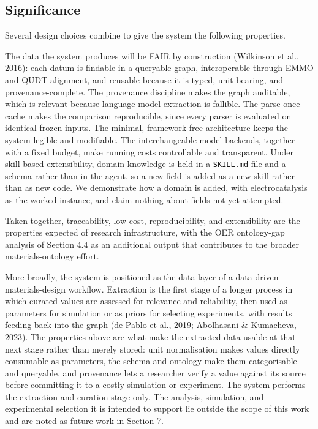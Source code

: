 \documentclass{template}
\begin{document}
\subsection{Significance}

Several design choices combine to give the system the following properties.

The data the system produces will be FAIR by construction (Wilkinson et al., 2016): each datum is findable in a queryable graph, interoperable through EMMO and QUDT alignment, and reusable because it is typed, unit-bearing, and provenance-complete. The provenance discipline makes the graph auditable, which is relevant because language-model extraction is fallible. The parse-once cache makes the comparison reproducible, since every parser is evaluated on identical frozen inputs. The minimal, framework-free architecture keeps the system legible and modifiable. The interchangeable model backends, together with a fixed budget, make running costs controllable and transparent. Under skill-based extensibility, domain knowledge is held in a \texttt{SKILL.md} file and a schema rather than in the agent, so a new field is added as a new skill rather than as new code. We demonstrate how a domain is added, with electrocatalysis as the worked instance, and claim nothing about fields not yet attempted.

Taken together, traceability, low cost, reproducibility, and extensibility are the properties expected of research infrastructure, with the OER ontology-gap analysis of Section 4.4 as an additional output that contributes to the broader materials-ontology effort.

More broadly, the system is positioned as the data layer of a data-driven materials-design workflow. Extraction is the first stage of a longer process in which curated values are assessed for relevance and reliability, then used as parameters for simulation or as priors for selecting experiments, with results feeding back into the graph (de Pablo et al., 2019; Abolhasani \& Kumacheva, 2023). The properties above are what make the extracted data usable at that next stage rather than merely stored: unit normalisation makes values directly consumable as parameters, the schema and ontology make them categorisable and queryable, and provenance lets a researcher verify a value against its source before committing it to a costly simulation or experiment. The system performs the extraction and curation stage only. The analysis, simulation, and experimental selection it is intended to support lie outside the scope of this work and are noted as future work in Section 7.
\end{document}
